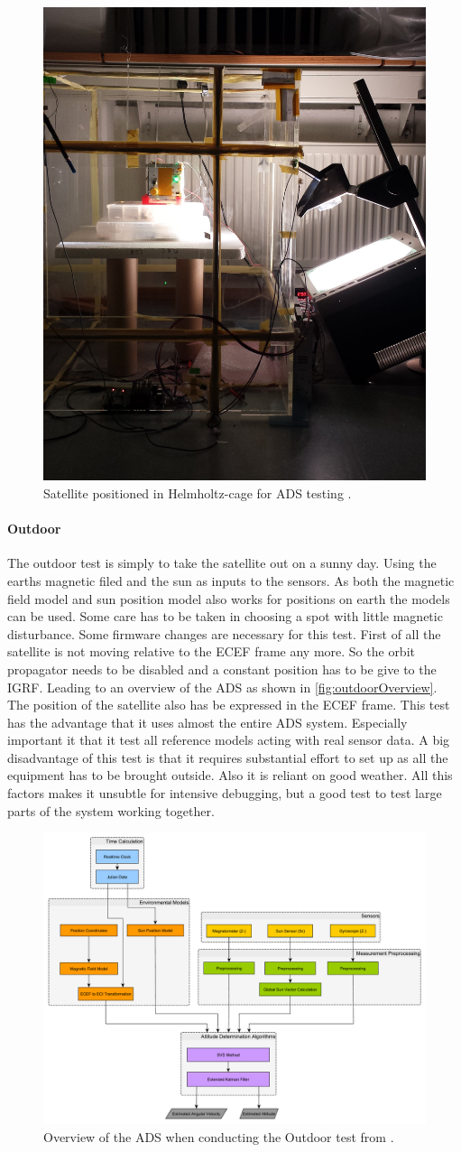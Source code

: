 \begin{figure}[tbp]
	\centering
	\includegraphics[width=0.3\columnwidth]{./Pictures/Helmholtz_night}
	\caption{Satellite positioned in Helmholtz-cage for ADS testing \cite{DavidThesis}.}
	\label{fig:Helmholtz-Cage}
\end{figure}               

\paragraph{Outdoor}
The outdoor test is simply to take the satellite out on a sunny day. Using the earths magnetic filed and the sun as inputs to the sensors. As both the magnetic field model and sun position model also works for positions on earth the models can be used. Some care has to be taken in choosing a spot with little magnetic disturbance. Some firmware changes are necessary for this test. First of all the satellite is not moving relative to the ECEF frame any more. So the orbit propagator needs to be disabled and a constant position has to be give to the IGRF. Leading to an overview of the ADS as shown in \autoref{fig:outdoorOverview}. The position of the satellite also has be expressed in the ECEF frame. This test has the advantage that it uses almost the entire ADS system. Especially important it that it test all reference models acting with real sensor data. A big disadvantage of this test is that it requires substantial effort to set up as all the equipment has to be brought outside. Also it is reliant on good weather. All this factors makes it unsubtle for intensive debugging, but a good test to test large parts of the system working together.         

\begin{figure}[tbp]
	\centering
	\includegraphics[width=0.5\columnwidth]{./Pictures/ATTDET_Architecture_O}
	\caption{Overview of the ADS when conducting the Outdoor test from \cite{DavidThesis}.}
	\label{fig:outrdoorOverview}
\end{figure}

